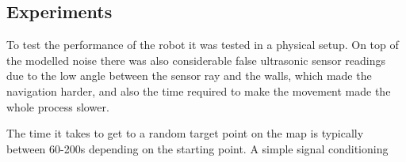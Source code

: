 \subsection{Experiments}

	To test the performance of the robot it was tested in a physical setup. On top of the modelled noise there was also considerable false ultrasonic sensor readings due to the low angle between the sensor ray and the walls, which made the navigation harder, and also the time required to make the movement made the whole process slower. 
	
	The time it takes to get to a random target point on the map is typically between 60-200s depending on the starting point. A simple signal conditioning  